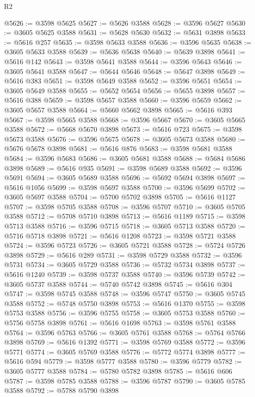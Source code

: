 \begin{lexlean}{R2}
\begin{coremodule}
@5626 := @3598 @5625
@5627 := @5626 @3588
@5628 := @3596 @5627
@5630 := @3605 @5625 @3588
@5631 := @5628 @5630
@5632 := @5631 @3898
@5633 := @5616 @257
@5635 := @3598 @5633 @3588
@5636 := @3596 @5635
@5638 := @3605 @5633 @3588
@5639 := @5636 @5638
@5640 := @5639 @3898
@5641 := @5616 @142
@5643 := @3598 @5641 @3588
@5644 := @3596 @5643
@5646 := @3605 @5641 @3588
@5647 := @5644 @5646
@5648 := @5647 @3898
@5649 := @5616 @383
@5651 := @3598 @5649 @3588
@5652 := @3596 @5651
@5654 := @3605 @5649 @3588
@5655 := @5652 @5654
@5656 := @5655 @3898
@5657 := @5616 @388
@5659 := @3598 @5657 @3588
@5660 := @3596 @5659
@5662 := @3605 @5657 @3588
@5664 := @5660 @5662 @3898
@5665 := @5616 @393
@5667 := @3598 @5665 @3588
@5668 := @3596 @5667
@5670 := @3605 @5665 @3588
@5672 := @5668 @5670 @3898
@5673 := @5616 @723
@5675 := @3598 @5673 @3588
@5676 := @3596 @5675
@5678 := @3605 @5673 @3588
@5680 := @5676 @5678 @3898
@5681 := @5616 @876
@5683 := @3598 @5681 @3588
@5684 := @3596 @5683
@5686 := @3605 @5681 @3588
@5688 := @5684 @5686 @3898
@5689 := @5616 @935
@5691 := @3598 @5689 @3588
@5692 := @3596 @5691
@5694 := @3605 @5689 @3588
@5696 := @5692 @5694 @3898
@5697 := @5616 @1056
@5699 := @3598 @5697 @3588
@5700 := @3596 @5699
@5702 := @3605 @5697 @3588
@5704 := @5700 @5702 @3898
@5705 := @5616 @1127
@5707 := @3598 @5705 @3588
@5708 := @3596 @5707
@5710 := @3605 @5705 @3588
@5712 := @5708 @5710 @3898
@5713 := @5616 @1189
@5715 := @3598 @5713 @3588
@5716 := @3596 @5715
@5718 := @3605 @5713 @3588
@5720 := @5716 @5718 @3898
@5721 := @5616 @1208
@5723 := @3598 @5721 @3588
@5724 := @3596 @5723
@5726 := @3605 @5721 @3588
@5728 := @5724 @5726 @3898
@5729 := @5616 @289
@5731 := @3598 @5729 @3588
@5732 := @3596 @5731
@5734 := @3605 @5729 @3588
@5736 := @5732 @5734 @3898
@5737 := @5616 @1240
@5739 := @3598 @5737 @3588
@5740 := @3596 @5739
@5742 := @3605 @5737 @3588
@5744 := @5740 @5742 @3898
@5745 := @5616 @304
@5747 := @3598 @5745 @3588
@5748 := @3596 @5747
@5750 := @3605 @5745 @3588
@5752 := @5748 @5750 @3898
@5753 := @5616 @1370
@5755 := @3598 @5753 @3588
@5756 := @3596 @5755
@5758 := @3605 @5753 @3588
@5760 := @5756 @5758 @3898
@5761 := @5616 @1698
@5763 := @3598 @5761 @3588
@5764 := @3596 @5763
@5766 := @3605 @5761 @3588
@5768 := @5764 @5766 @3898
@5769 := @5616 @1392
@5771 := @3598 @5769 @3588
@5772 := @3596 @5771
@5774 := @3605 @5769 @3588
@5776 := @5772 @5774 @3898
@5777 := @5616 @594
@5779 := @3598 @5777 @3588
@5780 := @3596 @5779
@5782 := @3605 @5777 @3588
@5784 := @5780 @5782 @3898
@5785 := @5616 @606
@5787 := @3598 @5785 @3588
@5788 := @3596 @5787
@5790 := @3605 @5785 @3588
@5792 := @5788 @5790 @3898

\end{coremodule}
\end{lexlean}
